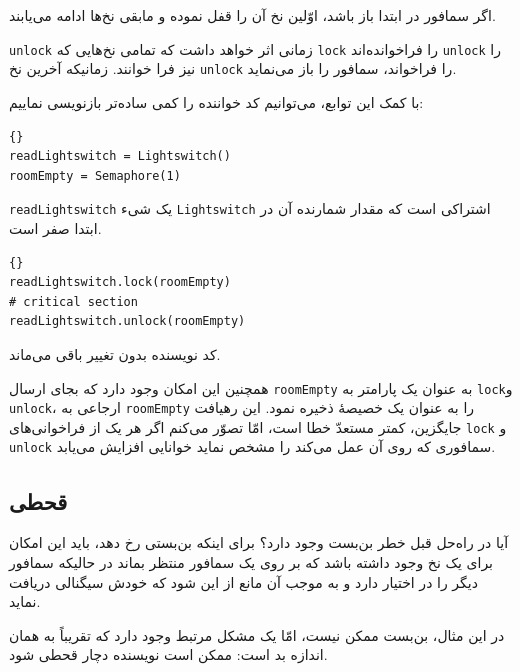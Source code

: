 \documentclass{book}
\begin{document}
    اگر سمافور در ابتدا باز باشد، اوّلین نخ آن را قفل نموده و مابقی نخ‌ها ادامه می‌یابند. 

{\tt unlock} 
    زمانی اثر خواهد داشت که تمامی نخ‌هایی که {\tt lock} را فراخوانده‌اند {\tt unlock} را نیز فرا خوانند.
    زمانیکه آخرین نخ {\tt unlock} را فراخواند، سمافور را باز می‌نماید. 

\newpage
    با کمک این توابع، می‌توانیم کد خواننده را کمی ساده‌تر بازنویسی نماییم: 

\begin{latin}
\begin{lstlisting}[title=\rl{مقداردهی اوّلیهٔ خوانندگان-نویسندگان}]{}
readLightswitch = Lightswitch()
roomEmpty = Semaphore(1)
\end{lstlisting}
\end{latin}

    {\tt readLightswitch} 
    یک شیء  {\tt Lightswitch} اشتراکی است که مقدار شمارنده آن در ابتدا صفر است. 


\begin{latin}
\begin{lstlisting}[title=\rl{راه‌حل خوانندگان-نویسندگان (خواننده)}]{}
readLightswitch.lock(roomEmpty)
# critical section
readLightswitch.unlock(roomEmpty)
\end{lstlisting}
\end{latin}

    کد نویسنده بدون تغییر باقی می‌ماند. 

    همچنین این امکان وجود دارد که بجای ارسال {\tt roomEmpty} به عنوان یک پارامتر به {\tt lock}و  {\tt unlock}، 
    ارجاعی  به {\tt roomEmpty} را به عنوان یک خصیصهٔ‌  ذخیره نمود. این رهیافت جایگزین، کمتر مستعدّ خطا است،
    امّا تصوّر می‌کنم اگر هر یک از فراخوانی‌های {\tt lock} و  {\tt unlock} سمافوری که روی آن عمل می‌کند را مشخص نماید خوانایی افزایش می‌یابد. 
    
\subsection{قحطی}

    آیا در راه‌حل قبل خطر بن‌بست وجود دارد؟ 
    برای اینکه بن‌بستی رخ دهد، باید این امکان برای یک نخ وجود داشته باشد که بر  روی یک سمافور منتظر بماند در حالیکه سمافور دیگر را در اختیار دارد و 
    به موجب آن مانع از این شود که خودش سیگنالی دریافت نماید. 

    در این مثال، بن‌بست ممکن نیست، امّا یک مشکل مرتبط وجود دارد که تقریباً به همان اندازه بد است:‌ ممکن است نویسنده دچار قحطی شود. 
\end{document}
